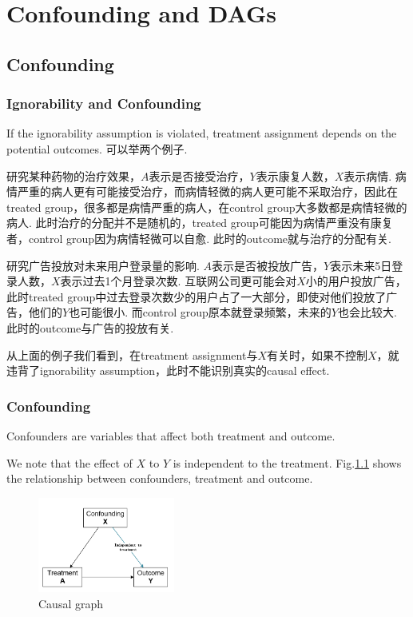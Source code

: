 \chapter{Confounding and DAGs}
\section{Confounding}
\subsection{Ignorability and Confounding}
If the ignorability assumption is violated, treatment assignment depends on the potential outcomes. 可以举两个例子.

\begin{ex}
	研究某种药物的治疗效果，$A$表示是否接受治疗，$Y$表示康复人数，$X$表示病情. 病情严重的病人更有可能接受治疗，而病情轻微的病人更可能不采取治疗，因此在treated group，很多都是病情严重的病人，在control group大多数都是病情轻微的病人. 此时治疗的分配并不是随机的，treated group可能因为病情严重没有康复者，control group因为病情轻微可以自愈. 此时的outcome就与治疗的分配有关.
\end{ex}
\begin{ex}
	研究广告投放对未来用户登录量的影响. $A$表示是否被投放广告，$Y$表示未来5日登录人数，$X$表示过去1个月登录次数. 互联网公司更可能会对$X$小的用户投放广告，此时treated group中过去登录次数少的用户占了一大部分，即使对他们投放了广告，他们的$Y$也可能很小. 而control group原本就登录频繁，未来的$Y$也会比较大. 此时的outcome与广告的投放有关.
\end{ex}

从上面的例子我们看到，在treatment assignment与$X$有关时，如果不控制$X$，就违背了ignorability assumption，此时不能识别真实的causal effect.

\subsection{Confounding}
{\color{red} Confounders} are variables that affect both treatment and outcome. 

We note that the effect of $X$ to $Y$ is independent to the treatment. Fig.\ref{cslgph} shows the relationship between confounders, treatment and outcome.

\begin{figure}[htbp]
	\setlength{\abovecaptionskip}{0pt}     %
	\setlength{\belowcaptionskip}{10pt}
	\vspace{-0cm}  %
	\setlength{\abovecaptionskip}{-0cm}   %
	\setlength{\belowcaptionskip}{-0cm}   %
	\centering
	\includegraphics[width=0.4\textwidth]{figure/cslgph.png}
	\caption{Causal graph}
	\label{cslgph}
\end{figure}
	
